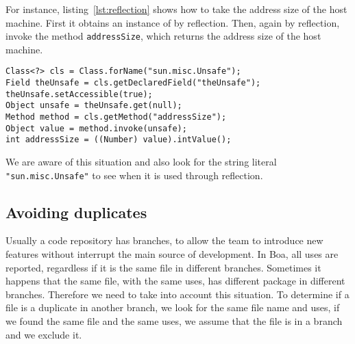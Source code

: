 For instance, listing~\ref{lst:reflection} shows how to take the address size of the host machine.
First it obtains an instance of \smu{} by reflection.
Then, again by reflection, invoke the method \texttt{addressSize}, which returns the address size of the host machine.


 

\lstset{style=java}
\lstset{escapechar=§}

\begin{lstlisting}[caption=Use of sun.misc.Unsafe with reflection,label=lst:reflection]
Class<?> cls = Class.forName("sun.misc.Unsafe");
Field theUnsafe = cls.getDeclaredField("theUnsafe");
theUnsafe.setAccessible(true);
Object unsafe = theUnsafe.get(null);
Method method = cls.getMethod("addressSize");
Object value = method.invoke(unsafe);
int addressSize = ((Number) value).intValue();
\end{lstlisting}

We are aware of this situation and also look for the string literal \texttt{"sun.misc.Unsafe"} to see when it is used through reflection.

\subsection{Avoiding duplicates}

Usually a code repository has branches, to allow the team to introduce new features without interrupt the main source of development.
In Boa, all \smu{} uses are reported, regardless if it is the same file in different branches.
Sometimes it happens that the same file, with the same uses, has different package in different branches.
Therefore we need to take into account this situation.
To determine if a file is a duplicate in another branch, we look for the same file name and uses, if we found the same file and the same uses, we assume that the file is in a branch and we exclude it.

